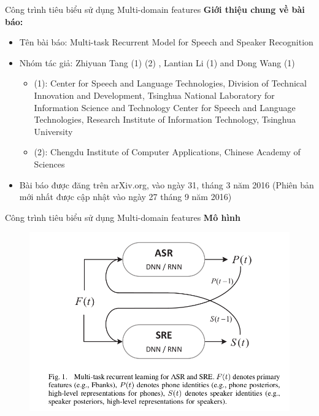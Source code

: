 \documentclass[notheorems, aspectratio=54]{beamer}
\begin{document}
\begin{frame}{Công trình tiêu biểu sử dụng Multi-domain features}
	\textbf{Giới thiệu chung về bài báo:}
	\begin{itemize}
		\item Tên bài báo: Multi-task Recurrent Model for Speech and Speaker Recognition
		\item Nhóm tác giả: Zhiyuan Tang (1) (2) , Lantian Li (1) and Dong Wang (1)
		\begin{itemize}
			\item (1): Center for Speech and Language Technologies, Division of Technical Innovation and Development,
			Tsinghua National Laboratory for Information Science and Technology
			Center for Speech and Language Technologies, Research Institute of Information Technology, Tsinghua University
			\item (2): Chengdu Institute of Computer Applications, Chinese Academy of Sciences
		\end{itemize}
		\item Bài báo được đăng trên arXiv.org, vào ngày 31, tháng 3 năm 2016 (Phiên bản mới nhất được cập nhật vào ngày 27 tháng 9 năm 2016)
	\end{itemize}
\end{frame}
\begin{frame}{Công trình tiêu biểu sử dụng Multi-domain features}
	\textbf{Mô hình}
	\begin{figure}[H]
		\centering
		\includegraphics[width=0.75\linewidth]{images/multi-task-recurrent-learning.png}
		\label{fig:writing-thesis}
	\end{figure}
\end{frame}
\end{document}
